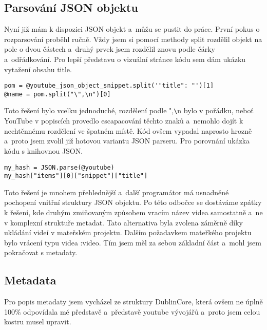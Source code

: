 \subsection{Parsování JSON objektu}
\par Nyní již mám k dispozici JSON objekt a~můžu se pustit do práce. První pokus o rozparsování proběhl ručně. Vždy jsem si pomocí methody split rozdělil objekt na pole o dvou částech a~druhý prvek jsem rozdělil znovu podle čárky a~odřádkování. Pro lepší představu o vizuální stránce kódu sem dám ukázku vytažení obsahu title.
\begin{verbatim}
pom = @youtube_json_object_snippet.split('"title": "')[1]
@name = pom.split("\",\n")[0]
\end{verbatim}
\par Toto řešení bylo vcelku jednoduché, rozdělení podle ",\verb|\|n bylo v pořádku, neboť YouTube v popiscích provedlo escapacování těchto znaků a~nemohlo dojít k nechtěnnému rozdělení ve špatném místě. Kód ovšem vypadal naprosto hrozně a~proto jsem zvolil již hotovou variantu JSON parseru. Pro porovnání ukázka kódu s knihovnou JSON.
\begin{verbatim}
my_hash = JSON.parse(@youtube)
my_hash["items"][0]["snippet"]["title"]
\end{verbatim}

\par Toto řešení je mnohem přehlednější a~další programátor má usnadněné pochopení vnitřní struktury JSON objektu. Po této odbočce se dostáváme zpátky k řešení, kde druhým zmiňovaným způsobem vracím název videa samostatně a~ne v komplexní struktuře metadat. Tato alternativa byla zvolena záměrně díky ukládání videí v mateřském projektu. Dalším požadavkem mateřkého projektu bylo vrácení typu videa :video. Tím jsem měl za sebou základní část a~mohl jsem pokračovat s metadaty.

\subsection{Metadata}

\par Pro popis metadaty jsem vycházel ze struktury DublinCore, která ovšem ne úplně 100\% odpovídala mé představě a~představě youtube vývojářů a~proto jsem celou kostru musel upravit. 


